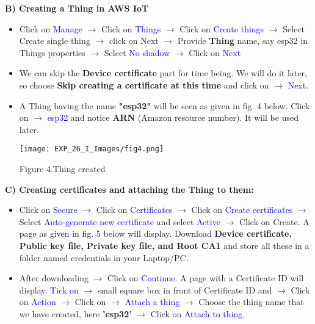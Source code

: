 \documentclass[12pt,a4paper]{article}
\begin{document}
\begin{justify}
\textbf{B)	Creating a Thing in AWS IoT}
\vspace{-3mm}
\begin{itemize}
 \setlength\itemsep{-0.3em}
\item Click on \textcolor{blue}{ Manage} $ \rightarrow $ Click on \textcolor{blue}{Things} $ \rightarrow $ Click on \textcolor{blue}{Create things} $ \rightarrow $ Select {Create single thing} $ \rightarrow $ click on Next $ \rightarrow $ Provide \textbf{Thing} name, say esp32 in Things properties $\rightarrow $ Select\textcolor{blue}{ No shadow} $ \rightarrow $ Click on \textcolor{blue}{Next}
\item We can skip the \textbf{Device certificate} part for time being. We will do it later, so choose \textbf{Skip creating a certificate at this time} and click on $ \rightarrow $ \textcolor{blue}{Next}.
\item A Thing having the name \textbf{"esp32"} will be seen as given in fig. 4 below. Click on $ \rightarrow $ \textcolor{blue}{esp32} and notice \textbf{ARN} (Amazon resource number). It will be used later.

\begin{center} 
\texttt{[image: EXP\_26\_I\_Images/fig4.png]}
\end{center}
\vspace{-10mm}
\begin{center} {Figure 4.Thing created }\end{center}
\end{itemize}



\textbf{C) Creating certificates and attaching the Thing to them:}
\vspace{-3mm}
\begin{itemize}
 \setlength\itemsep{-0.3em}
\item Click on  \textcolor{blue}{Secure} $ \rightarrow $ Click on \textcolor{blue}{Certificates} $ \rightarrow $ Click on \textcolor{blue}{Create certificates} $ \rightarrow $ Select \textcolor{blue}{Auto-generate new certificate} and select \textcolor{blue}{Active} $ \rightarrow $ Click on Create. A page as given in fig. 5 below will display. Download \textbf{Device certificate, Public key file, Private key file, and Root CA1}  and store all these in a  folder named credentials in your Laptop/PC. 

    \item After downloading $ \rightarrow $ Click on \textcolor{blue}{Continue}. A page with a Certificate ID will display. \textcolor{blue}{Tick on} $ \rightarrow $ small square box in front of Certificate ID and $ \rightarrow $ Click on \textcolor{blue}{Action} $ \rightarrow $ Click on $ \rightarrow $ \textcolor{blue}{Attach a thing} $ \rightarrow $ Choose the thing name that we have created, here \textbf{'esp32'}  $ \rightarrow $ Click on \textcolor{blue}{Attach to thing}.



\end{itemize}
\end{justify}
\end{document}

